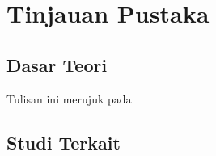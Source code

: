 \chapter{Tinjauan Pustaka}

\section{Dasar Teori}
\blindtext
Tulisan ini merujuk pada \parencite{knuth2001art}

\section{Studi Terkait}
\blindtext
